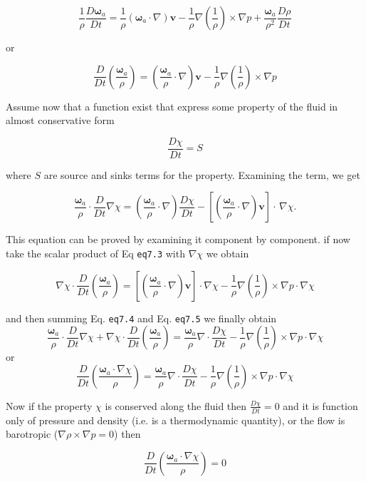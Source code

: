 \[\frac{1}{\rho}\frac{D \mathbf{\omega}_a}{Dt} = \frac{1}{\rho}(\mathbf{\omega}_a\cdot\nabla) \mathbf{v}  -\frac{1}{\rho}\nabla\left(\frac{1}{\rho}\right)\times\nabla p +\frac{\mathbf{\omega}_a}{\rho^2}\frac{D \rho}{Dt}\]

or

\[\frac{D }{Dt}\left(\frac{\mathbf{\omega}_a}{\rho}\right) = \left(\frac{\mathbf{\omega}_a}{\rho }\cdot\nabla\right) \mathbf{v}  -\frac{1}{\rho}\nabla\left(\frac{1}{\rho}\right)\times\nabla p\]

Assume now that a function exist that express some property of the fluid
in almost conservative form

\[\frac{D \chi}{Dt} = S\]

where \(S\) are source and sinks terms for the property. Examining the
term, we get

\[\frac{\mathbf{\omega}_a }{\rho}\cdot \frac{D }{Dt}\nabla \chi = \left(\frac{\mathbf{\omega}_a }{\rho} \cdot\nabla\right) \frac{D  \chi}{Dt}- \left[\left(\frac{\mathbf{\omega}_a }{\rho} \cdot \nabla \right)\mathbf{v}\right]\cdot \,\nabla{ \chi}.\]

This equation can be proved by examining it component by component. if
now take the scalar product of Eq \texttt{eq7.3} with \(\nabla \chi\) we
obtain

\[\nabla\chi\cdot\frac{D }{Dt}\left(\frac{\mathbf{\omega}_a}{\rho}\right) = \left[\left(\frac{\mathbf{\omega}_a}{\rho }\cdot\nabla\right) \mathbf{v}\right]\cdot\nabla\chi  -\frac{1}{\rho}\nabla\left(\frac{1}{\rho}\right)\times\nabla p \cdot \nabla\chi\]

and then summing Eq. \texttt{eq7.4} and Eq. \texttt{eq7.5} we finally
obtain
\[\frac{\mathbf{\omega}_a }{\rho}\cdot \frac{D }{Dt}\nabla \chi +\nabla\chi\cdot\frac{D }{Dt}\left(\frac{\mathbf{\omega}_a}{\rho}\right)= \frac{\mathbf{\omega}_a }{\rho} \nabla\cdot \frac{D  \chi}{Dt}
-\frac{1}{\rho}\nabla\left(\frac{1}{\rho}\right)\times\nabla p \cdot \nabla\chi\]
or
\[
\frac{D }{Dt}\left(\frac{\mathbf{\omega}_a\cdot\nabla\chi}{\rho}\right)= \frac{\mathbf{\omega}_a }{\rho} \nabla\cdot \frac{D  \chi}{Dt}
-\frac{1}{\rho}\nabla\left(\frac{1}{\rho}\right)\times\nabla p \cdot \nabla\chi
\]

Now if the property \(\chi\) is conserved along the fluid then
\(\frac{D \chi}{Dt}=0\) and it is function only of pressure and density
(i.e. is a thermodynamic quantity), or the flow is barotropic
(\(\nabla \rho \times \nabla p =0\)) then

\[\frac{D }{Dt}\left(\frac{\mathbf{\omega}_a\cdot\nabla\chi}{\rho}\right)= 0\]

